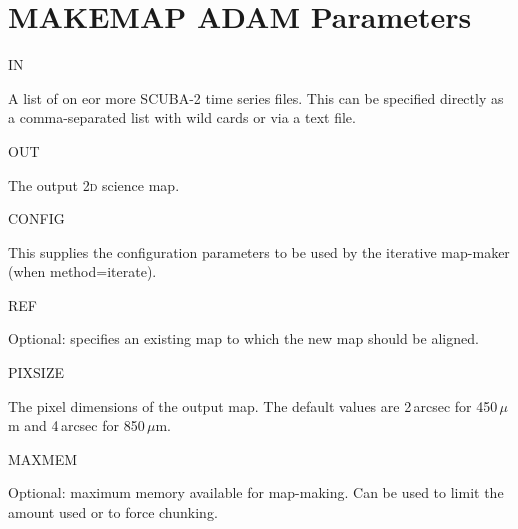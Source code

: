 \documentclass[twoside,11pt]{article}
\newcommand{\xlabel}[1]{}
\renewcommand{\_}{\texttt{\symbol{95}}}
\begin{document}
\newpage
\section{\xlabel{adam}MAKEMAP ADAM Parameters}
\label{app:adam}

\begin{minipage}[t]{0.2\linewidth}
IN
\end{minipage}
\begin{minipage}[t]{0.8\linewidth}A list of on eor more SCUBA-2 time
series files.  This can be specified directly as a comma-separated
list with wild cards or via a text file.
\end{minipage}

\begin{minipage}[t]{0.2\linewidth}
OUT
\end{minipage}
\begin{minipage}[t]{0.8\linewidth}The output 2\textsc{d} science map.
\end{minipage}

\begin{minipage}[t]{0.2\linewidth}
CONFIG
\end{minipage}
\begin{minipage}[t]{0.8\linewidth}This supplies the configuration
parameters to be used by the iterative map-maker (when method=iterate).
\end{minipage}

\begin{minipage}[t]{0.2\linewidth}
REF
\end{minipage}
\begin{minipage}[t]{0.8\linewidth}Optional: specifies an existing map
to which the new map should be aligned.
\end{minipage}

\begin{minipage}[t]{0.2\linewidth}
PIXSIZE
\end{minipage}
\begin{minipage}[t]{0.8\linewidth}The pixel dimensions of the output
map.  The default values are 2\,arcsec for 450\,$\mu$m and 4\,arcsec
for 850\,$\mu$m.
\end{minipage}

\begin{minipage}[t]{0.2\linewidth}
MAXMEM
\end{minipage}
\begin{minipage}[t]{0.8\linewidth}Optional: maximum memory available
for map-making.  Can be used to limit the amount used or to force
chunking.
\end{minipage}
\end{document}

